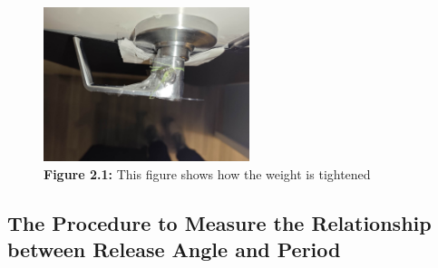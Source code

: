 \documentclass[11pt,titlepage,a4paper,twocolumn]{article}
\begin{document}
    \begin{figure}
        \centering
        \includegraphics[width=6cm]{setup2.jpg}
        \caption*{\textbf{Figure 2.1:} This figure shows how the weight is tightened}
        \label{fig:enter-label}
    \end{figure}
    \subsection{The Procedure to Measure the Relationship between Release Angle and Period}
\end{document}
